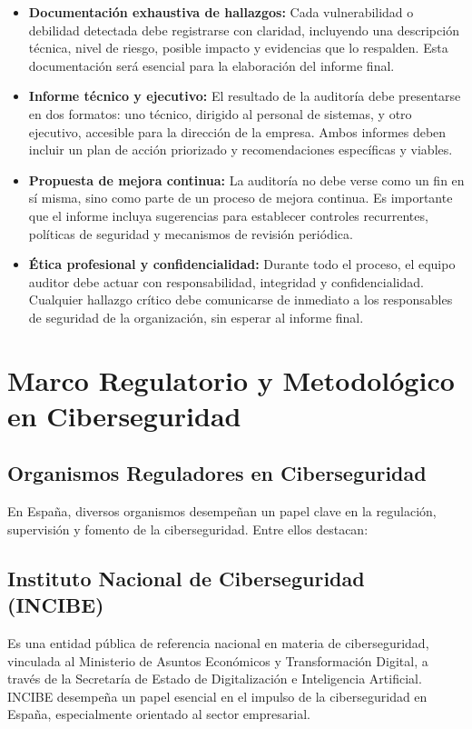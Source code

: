\documentclass[a4paper, 10pt]{article}
\begin{document}
\begin{itemize}
    \item \textbf{Documentación exhaustiva de hallazgos:}  
    Cada vulnerabilidad o debilidad detectada debe registrarse con claridad, incluyendo una descripción técnica, nivel de riesgo, posible impacto y evidencias que lo respalden. Esta documentación será esencial para la elaboración del informe final.

    \item \textbf{Informe técnico y ejecutivo:}  
    El resultado de la auditoría debe presentarse en dos formatos: uno técnico, dirigido al personal de sistemas, y otro ejecutivo, accesible para la dirección de la empresa. Ambos informes deben incluir un plan de acción priorizado y recomendaciones específicas y viables.

    \item \textbf{Propuesta de mejora continua:}  
    La auditoría no debe verse como un fin en sí misma, sino como parte de un proceso de mejora continua. Es importante que el informe incluya sugerencias para establecer controles recurrentes, políticas de seguridad y mecanismos de revisión periódica.

    \item \textbf{Ética profesional y confidencialidad:}  
    Durante todo el proceso, el equipo auditor debe actuar con responsabilidad, integridad y confidencialidad. Cualquier hallazgo crítico debe comunicarse de inmediato a los responsables de seguridad de la organización, sin esperar al informe final.

\end{itemize}

\section{Marco Regulatorio y Metodológico en Ciberseguridad}

\subsection{Organismos Reguladores en Ciberseguridad}

En España, diversos organismos desempeñan un papel clave en la regulación, supervisión y fomento de la ciberseguridad. Entre ellos destacan:
\par\vspace{0.5cm}

\subsection*{Instituto Nacional de Ciberseguridad (INCIBE)}
 Es una entidad pública de referencia nacional en materia de ciberseguridad, vinculada al Ministerio de Asuntos Económicos 
y Transformación Digital, a través de la Secretaría de Estado de Digitalización e Inteligencia Artificial. INCIBE desempeña un papel esencial en el impulso de la 
ciberseguridad en España, especialmente orientado al sector empresarial. \cite{incibe}
\end{document}
